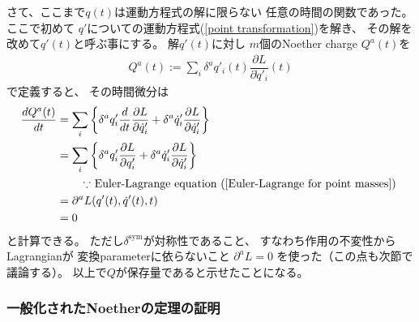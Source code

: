 さて、ここまで$q(t)$は運動方程式の解に限らない
任意の時間の関数であった。
ここで初めて
$q'$についての運動方程式(\ref{point transformation})を解き、
その解を改めて$q'(t)$と呼ぶ事にする。
解$q'(t)$に対し
$m$個のNoether charge $Q^a(t)$を
\begin{align}
  Q^a(t):=
  \sum_i
    \delta^a q'_i (t)
  \dfrac{\partial L}{\partial \dot{q}'_i} (t)
\end{align}
で定義すると、
その時間微分は
\begin{align}
  \dfrac{d Q^a(t)}{dt}
&=
  \sum_i
  \bigg\{
    \delta^a q'_i
  \dfrac{d}{dt}\dfrac{\partial L}{\partial \dot{q}'_i }
+
    \delta^a \dot{q}'_i
    \dfrac{\partial L}{\partial \dot{q}'_i}
  \bigg\}
\notag\\&=
  \sum_i
  \bigg\{
      \delta^a q'_i
    \dfrac{\partial L}{\partial q'_i}
  +
      \delta^a \dot{q}'_i
    \dfrac{\partial L}{\partial \dot{q}'_i}
  \bigg\}
\\&\qquad
    \text{
      $\because$ Euler-Lagrange equation
      (\ref{Euler-Lagrange for point masses})
    }
\notag\\&=
  \partial^a L(q'(t),\dot{q}'(t),t)
  \notag\\&= 0
\end{align}
と計算できる。
ただし$\delta^{\mathrm{sym}}$が対称性であること、
すなわち作用の不変性からLagrangianが
変換parameterに依らないこと
$\partial^a L = 0$
を使った（この点も次節で議論する）。
以上で$Q$が保存量であると示せたことになる。

\subsubsection{一般化されたNoetherの定理の証明}

